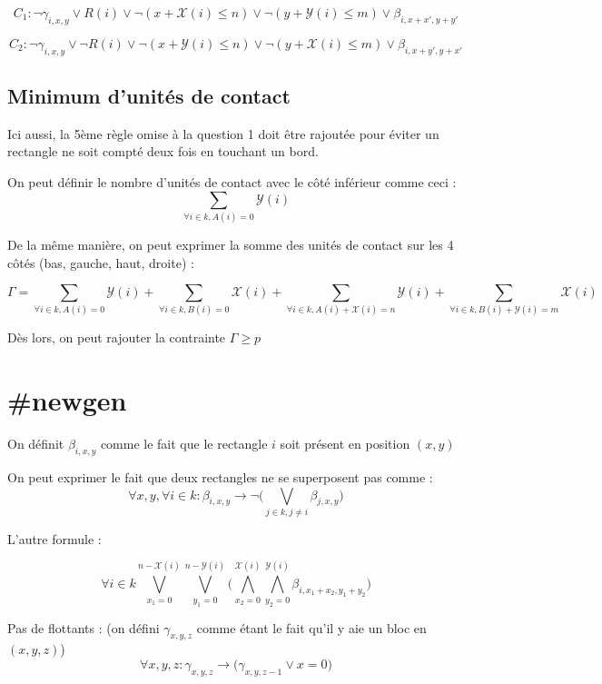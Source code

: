 \documentclass[a4paper]{article}
\begin{document}
$$
C_1 :
\lnot \gamma_{i, x, y} \lor R(i)
\lor \lnot (x + \mathcal{X}(i) \leq n)
\lor \lnot (y + \mathcal{Y}(i) \leq m)
\lor \beta_{i, x + x', y + y'}
$$

$$
C_2 :
\lnot \gamma_{i, x, y} \lor \lnot R(i)
\lor \lnot (x + \mathcal{Y}(i) \leq n)
\lor \lnot (y + \mathcal{X}(i) \leq m)
\lor \beta_{i, x + y', y + x'}
$$


\subsection{Minimum d'unités de contact}

Ici aussi, la 5ème règle omise à la question 1 doit être rajoutée pour éviter un rectangle ne soit compté deux fois en touchant un bord.

On peut définir le nombre d'unités de contact avec le côté inférieur comme ceci :
$$
\sum_{\forall i \in k, A(i) = 0} \mathcal{Y}(i)
$$

De la même manière, on peut exprimer la somme des unités de contact sur les 4 côtés (bas, gauche, haut, droite) :

$$
\Gamma = \sum_{\forall i \in k, A(i) = 0} \mathcal{Y}(i) +
\sum_{\forall i \in k, B(i) = 0} \mathcal{X}(i) +
\sum_{\forall i \in k, A(i) + \mathcal{X}(i) =  n} \mathcal{Y}(i) +
\sum_{\forall i \in k, B(i) + \mathcal{Y}(i) = m} \mathcal{X}(i)
$$

Dès lors, on peut rajouter la contrainte $\Gamma \geq p$


\section{\#newgen}

On définit $\beta_{i, x, y}$ comme le fait que le rectangle $i$ soit présent en position $(x,y)$

On peut exprimer le fait que deux rectangles ne se superposent pas comme : $$
\forall x,y , \forall i \in k : \beta_{i, x, y} \rightarrow
\lnot \Big( \bigvee_{j \in k, j \neq i} \beta_{j, x, y} \Big)
$$

L'autre formule :

$$
\forall i \in k \bigvee_{x_1=0}^{n-\mathcal{X}(i)} \bigvee_{y_1=0}^{n-\mathcal{Y}(i)}
\Big(
  \bigwedge_{x_2=0}^{\mathcal{X}(i)} \bigwedge_{y_2=0}^{\mathcal{Y}(i)} \beta_{i, x_1 + x_2, y_1 + y_2}
\Big)
$$


Pas de flottants : (on défini $\gamma_{x, y , z}$ comme étant le fait qu'il y aie un bloc en $(x, y , z)$)
$$
\forall x,y,z : \gamma_{x, y, z} \rightarrow  \Big( \gamma_{x, y, z - 1}  \lor x = 0 \Big)
$$
\end{document}
